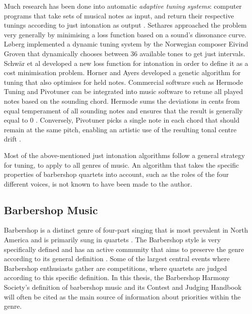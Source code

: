 \documentclass[a4paper]{article}
\begin{document}
Much research has been done into automatic \textit{adaptive tuning systems}: computer programs that take sets of musical notes as input, and return their respective tunings according to just intonation as output \cite{sethares_adaptive_2005}. Sethares \cite{sethares_adaptive_1994} approached the problem very generally by minimising a loss function based on a sound's dissonance curve. Løberg \cite{code_grovenmax_2002} implemented a dynamic tuning system by the Norwegian composer Eivind Groven that dynamically chooses between 36 available tones to get just intervals. Schwär et al \cite{schwar_differentiable_2021} developed a new loss function for intonation in order to define it as a cost minimisation problem. Horner and Ayers \cite{horner_common_1996} developed a genetic algorithm for tuning that also optimises for held notes. Commercial software such as Hermode Tuning \cite{mohrlok_hermode_2003} and Pivotuner \cite{volkov_pivotuner_2022} can be integrated into music software to retune all played notes based on the sounding chord. Hermode sums the deviations in cents from equal temperament of all sounding notes and ensures that the result is generally equal to 0 \cite{mohrlok_hermode_2003}. Conversely, Pivotuner picks a single note in each chord that should remain at the same pitch, enabling an artistic use of the resulting tonal centre drift \cite{volkov_pivotuner_2022}.

Most of the above-mentioned just intonation algorithms follow a general strategy for tuning, to apply to all genres of music. An algorithm that takes the specific properties of barbershop quartets into account, such as the roles of the four different voices, is not known to have been made to the author.

\subsection{Barbershop Music}
\label{intro_bs}
Barbershop is a distinct genre of four-part singing that is most prevalent in North America and is primarily sung in quartets \cite{johnson_yes_1972}. The Barbershop style is very specifically defined and has an active community that aims to preserve the genre according to its general definition \cite{averill_barbershop_2000}. Some of the largest central events where Barbershop enthusiasts gather are competitions, where quartets are judged according to this specific definition. In this thesis, the Barbershop Harmony Society's definition of barbershop music and its Contest and Judging Handbook \cite{barbershop_harmony_society_contest_2022} will often be cited as the main source of information about priorities within the genre.
\end{document}

